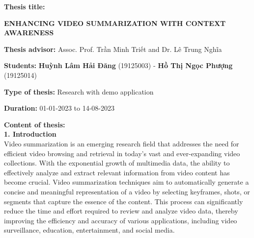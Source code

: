 \documentclass[14pt]{extarticle}
\begin{document}
    \vspace{.5cm}
    \textbf{\large Thesis title:}
    
    \begin{center}
        
        \textbf{\Large ENHANCING VIDEO SUMMARIZATION WITH CONTEXT AWARENESS} \\
    
    \end{center}
    
    
    \vspace{.5cm}
    \textbf{\large Thesis advisor:} Assoc. Prof. Trần Minh Triết and Dr. Lê Trung Nghĩa
    
    \vspace{.5cm}
    \textbf{\large Students:}  \textbf{Huỳnh Lâm Hải Đăng} (19125003) - \textbf{Hồ Thị Ngọc Phượng} (19125014)
    
    \vspace{.5cm}
    \textbf{\large Type of thesis:} Research with demo application
    
    \vspace{.5cm}
    \textbf{\large Duration:} 01-01-2023 to 14-08-2023
    
    \vspace{.5cm}
    \textbf{\large Content of thesis:} \\

    \textbf{1. Introduction} \\
    Video summarization is an emerging research field that addresses the need for efficient video browsing and retrieval in today's vast and ever-expanding video collections. With the exponential growth of multimedia data, the ability to effectively analyze and extract relevant information from video content has become crucial. Video summarization techniques aim to automatically generate a concise and meaningful representation of a video by selecting keyframes, shots, or segments that capture the essence of the content. This process can significantly reduce the time and effort required to review and analyze video data, thereby improving the efficiency and accuracy of various applications, including video surveillance, education, entertainment, and social media.
\end{document}
